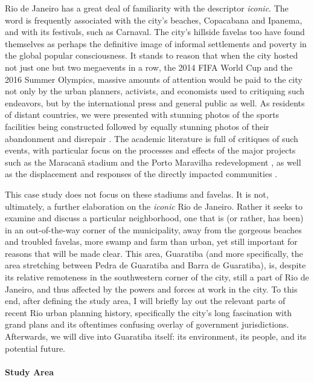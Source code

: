 Rio de Janeiro has a great deal of familiarity with the descriptor \textit{iconic}. The word is frequently associated with the city's beaches, Copacabana and Ipanema, and with its festivals, such as Carnaval. The city's hillside favelas too have found themselves as perhaps the definitive image of informal settlements and poverty in the global popular consciousness. It stands to reason that when the city hosted not just one but two megaevents in a row, the 2014 FIFA World Cup and the 2016 Summer Olympics, massive amounts of attention would be paid to the city not only by the urban planners, activists, and economists used to critiquing such endeavors, but by the international press and general public as well. As residents of distant countries, we were presented with stunning photos of the sports facilities being constructed \cite{umlaufRioCityTransformed2016} followed by equally stunning photos of their abandonment and disrepair \cite{olivaresRioOlympicVenues2017}. The academic literature is full of critiques of such events, with particular focus on the processes and effects of the major projects such as the Maracanã stadium and the Porto Maravilha redevelopment \cite{sanchezMegaeventsUrbanRegeneration2013}, as well as the displacement and responses of the directly impacted communities  \cite{talbotHumanRightsAbuses2018,viehoffPoliticsMegaeventPlanning2016}. 

This case study does not focus on these stadiums and favelas. It is not, ultimately, a further elaboration on the \textit{iconic} Rio de Janeiro. Rather it seeks to examine and discuss a particular neighborhood, one that is (or rather, has been) in an out-of-the-way corner of the municipality, away from the gorgeous beaches and troubled favelas, more swamp and farm than urban, yet still important for reasons that will be made clear. This area, Guaratiba (and more specifically, the area stretching between Pedra de Guaratiba and Barra de Guaratiba), is, despite its relative remoteness in the southwestern corner of the city, still a part of Rio de Janeiro, and thus affected by the powers and forces at work in the city. To this end, after defining the study area, I will briefly lay out the relevant parts of recent Rio urban planning history, specifically the city's long fascination with grand plans and its oftentimes confusing overlay of government jurisdictions. Afterwards, we will dive into Guaratiba itself: its environment, its people, and its potential future. 

\paragraph{Study Area} \leavevmode\newline

